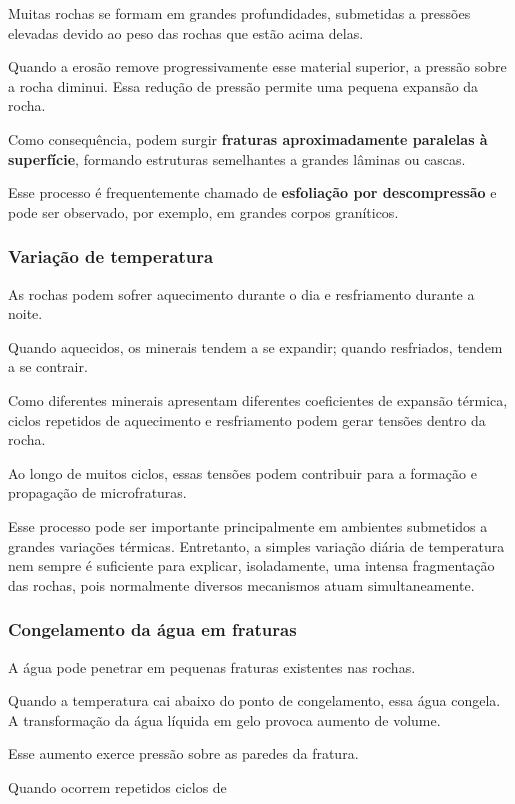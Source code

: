 \documentclass[a4paper,12pt]{article}
\theoremstyle{definition}
\theoremstyle{definition}
\theoremstyle{definition}
\begin{document}
Muitas rochas se formam em grandes profundidades, submetidas a pressões elevadas devido ao peso das rochas que estão acima delas.

Quando a erosão remove progressivamente esse material superior, a pressão sobre a rocha diminui. Essa redução de pressão permite uma pequena expansão da rocha.

Como consequência, podem surgir \textbf{fraturas aproximadamente paralelas à superfície}, formando estruturas semelhantes a grandes lâminas ou cascas.

Esse processo é frequentemente chamado de \textbf{esfoliação por descompressão} e pode ser observado, por exemplo, em grandes corpos graníticos.

\subsubsection{Variação de temperatura}

As rochas podem sofrer aquecimento durante o dia e resfriamento durante a noite.

Quando aquecidos, os minerais tendem a se expandir; quando resfriados, tendem a se contrair.

Como diferentes minerais apresentam diferentes coeficientes de expansão térmica, ciclos repetidos de aquecimento e resfriamento podem gerar tensões dentro da rocha.

Ao longo de muitos ciclos, essas tensões podem contribuir para a formação e propagação de microfraturas.

Esse processo pode ser importante principalmente em ambientes submetidos a grandes variações térmicas. Entretanto, a simples variação diária de temperatura nem sempre é suficiente para explicar, isoladamente, uma intensa fragmentação das rochas, pois normalmente diversos mecanismos atuam simultaneamente.

\subsubsection{Congelamento da água em fraturas}

A água pode penetrar em pequenas fraturas existentes nas rochas.

Quando a temperatura cai abaixo do ponto de congelamento, essa água congela. A transformação da água líquida em gelo provoca aumento de volume.

Esse aumento exerce pressão sobre as paredes da fratura.

Quando ocorrem repetidos ciclos de
\end{document}
